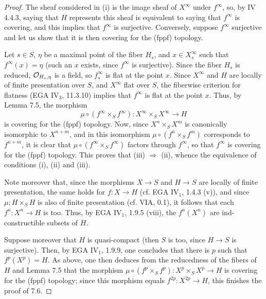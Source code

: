 \begin{proof}
The sheaf considered in (i) is the image sheaf of $X^\infty$ under $f^\infty$, so, by IV 4.4.3, saying that $H$ represents this sheaf is equivalent to saying that $f^\infty$ is covering, and this implies that $f^\infty$ is surjective. Conversely, suppose $f^\infty$ surjective and let us show that it is then covering for the (fppf) topology.

Let $s\in S$, $\eta$ be a maximal point of the fiber $H_s$, and $x\in X_s^\infty$ such that $f^\infty(x)=\eta$ (such an $x$ exists, since $f^\infty$ is surjective). Since the fiber $H_s$ is reduced, $\mathcal{O}_{H_s,\eta}$ is a field, so $f_s^\infty$ is flat at the point $x$. Since $X^\infty$ and $H$ are locally of finite presentation over $S$, and $X^\infty$ flat over $S$, the fiberwise criterion for flatness (EGA IV$_3$, 11.3.10) implies that $f^\infty$ is flat at the point $x$. Thus, by Lemma 7.5, the morphism
\[
\mu\circ(f^\infty\times_S f^\infty):X^\infty\times_S X^\infty\to H
\]
is covering for the (fppf) topology. Now, since $X^n\times_S X^m$ is canonically isomorphic to $X^{n+m}$, and in this isomorphism $\mu\circ(f^n\times_S f^m)$ corresponds to $f^{n+m}$, it is clear that $\mu\circ(f^\infty\times_S f^\infty)$ factors through $f^\infty$, so that $f^\infty$ is covering for the (fppf) topology. This proves that (iii) $\Rightarrow$ (ii), whence the equivalence of conditions (i), (ii) and (iii).

Note moreover that, since the morphisms $X\to S$ and $H\to S$ are locally of finite presentation, the same holds for $f:X\to H$ (cf. EGA IV$_1$, 1.4.3 (v)), and since $\mu:H\times_S H$ is also of finite presentation (cf. VIA, 0.1), it follows that each $f^n:X^n\to H$ is too. Thus, by EGA IV$_1$, 1.9.5 (viii), the $f^n(X^n)$ are ind-constructible subsets of $H$.

Suppose moreover that $H$ is quasi-compact (then $S$ is too, since $H\to S$ is surjective). Then, by EGA IV$_1$, 1.9.9, one concludes that there is $p$ such that $f^p(X^p)=H$. As above, one then deduces from the reducedness of the fibers of $H$ and Lemma 7.5 that the morphism $\mu\circ(f^p\times_S f^p):X^p\times_S X^p\to H$ is covering for the (fppf) topology; since this morphism equals $f^{2p}:X^{2p}\to H$, this finishes the proof of 7.6.
\end{proof}

